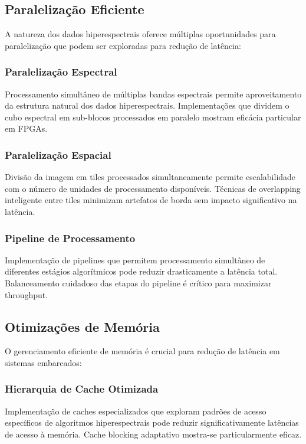 \subsection{Paralelização Eficiente}
A natureza dos dados hiperespectrais oferece múltiplas oportunidades para paralelização que podem ser exploradas para redução de latência:

\subsubsection{Paralelização Espectral}
Processamento simultâneo de múltiplas bandas espectrais permite aproveitamento da estrutura natural dos dados hiperespectrais. Implementações que dividem o cubo espectral em sub-blocos processados em paralelo mostram eficácia particular em FPGAs.

\subsubsection{Paralelização Espacial}
Divisão da imagem em tiles processados simultaneamente permite escalabilidade com o número de unidades de processamento disponíveis. Técnicas de overlapping inteligente entre tiles minimizam artefatos de borda sem impacto significativo na latência.

\subsubsection{Pipeline de Processamento}
Implementação de pipelines que permitem processamento simultâneo de diferentes estágios algorítmicos pode reduzir drasticamente a latência total. Balanceamento cuidadoso das etapas do pipeline é crítico para maximizar throughput.

\subsection{Otimizações de Memória}
O gerenciamento eficiente de memória é crucial para redução de latência em sistemas embarcados:

\subsubsection{Hierarquia de Cache Otimizada}
Implementação de caches especializados que exploram padrões de acesso específicos de algoritmos hiperespectrais pode reduzir significativamente latências de acesso à memória. Cache blocking adaptativo mostra-se particularmente eficaz.

